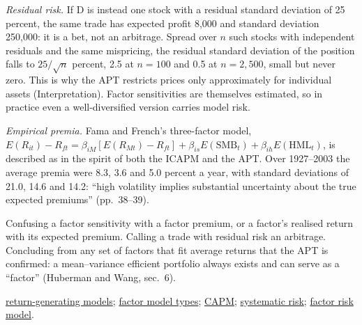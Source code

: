 \begin{qfmodel}
\emph{Residual risk.} If D is instead one stock with a residual standard deviation of 25 percent, the same trade has expected profit 8{,}000 and standard deviation 250{,}000: it is a bet, not an arbitrage. Spread over $n$ such stocks with independent residuals and the same mispricing, the residual standard deviation of the position falls to $25/\sqrt n$ percent, 2.5 at $n=100$ and 0.5 at $n=2{,}500$, small but never zero. This is why the APT restricts prices only approximately for individual assets (Interpretation). Factor sensitivities are themselves estimated, so in practice even a well-diversified version carries model risk.

\emph{Empirical premia.} Fama and French's three-factor model, $E(R_{it})-R_{ft}=\beta_{iM}[E(R_{Mt})-R_{ft}]+\beta_{is}E(\mathrm{SMB}_t)+\beta_{ih}E(\mathrm{HML}_t)$, is described as in the spirit of both the ICAPM and the APT. Over 1927--2003 the average premia were 8.3, 3.6 and 5.0 percent a year, with standard deviations of 21.0, 14.6 and 14.2: ``high volatility implies substantial uncertainty about the true expected premiums'' (pp.~38--39).

 Confusing a factor sensitivity with a factor premium, or a factor's realised return with its expected premium. Calling a trade with residual risk an arbitrage. Concluding from any set of factors that fit average returns that the APT is confirmed: a mean--variance efficient portfolio always exists and can serve as a ``factor'' (Huberman and Wang, sec.~6).

 \hyperref[mod:return-generating-models]{return-generating models}; \hyperref[def:factor-model-types]{factor model types}; \hyperref[mod:capm-sml]{CAPM}; \hyperref[mech:systematic-risk-pricing]{systematic risk}; \hyperref[mod:factor-risk-model]{factor risk model}.

\end{qfmodel}
